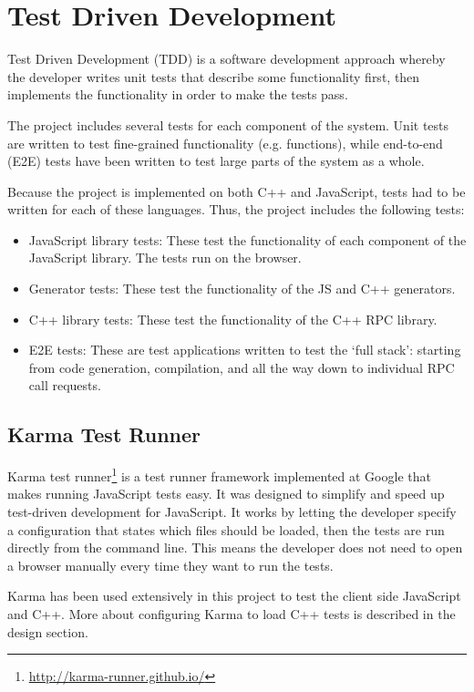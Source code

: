\section{Test Driven Development} %
\label{sec:test_driven_development}
Test Driven Development (TDD) is a software development approach whereby the developer writes unit tests that describe some functionality first, then implements the functionality in order to make the tests pass.

The project includes several tests for each component of the system. Unit tests are written to test fine-grained functionality (e.g. functions), while end-to-end (E2E) tests have been written to test large parts of the system as a whole.

Because the project is implemented on both C++ and JavaScript, tests had to be written for each of these languages. Thus, the project includes the following tests:

\begin{itemize}
	\item JavaScript library tests: These test the functionality of each component of the JavaScript library. The tests run on the browser.
	\item Generator tests: These test the functionality of the JS and C++ generators.
	\item C++ library tests: These test the functionality of the C++ RPC library.
	\item E2E tests: These are test applications written to test the `full stack': starting from code generation, compilation, and all the way down to individual RPC call requests.
\end{itemize}

\subsection{Karma Test Runner} %
\label{sub:karma_test_runner}
Karma test runner\footnote{\url{http://karma-runner.github.io/}} is a test runner framework implemented at Google that makes running JavaScript tests easy. It was designed to simplify and speed up test-driven development for JavaScript. It works by letting the developer specify a configuration that states which files should be loaded, then the tests are run directly from the command line. This means the developer does not need to open a browser manually every time they want to run the tests.

Karma has been used extensively in this project to test the client side JavaScript and C++. More about configuring Karma to load C++ tests is described in the design section.

